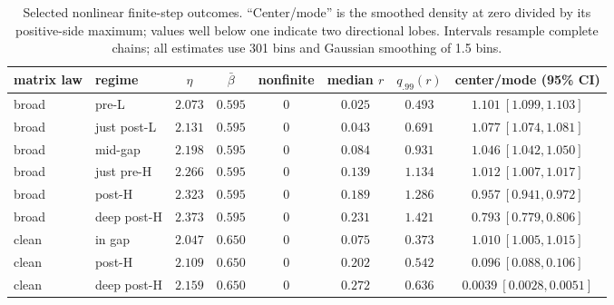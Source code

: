 \documentclass[11pt]{article}
\theoremstyle{definition}
\begin{document}
\begin{table}[ht]
\centering
\scriptsize
\begin{tabular}{@{}llcccccc@{}}
\toprule
matrix law & regime & $\eta$ & $\bar\beta$
& nonfinite & median $r$ & $q_{.99}(r)$ & center/mode (95\% CI) \\
\midrule
broad & pre-L & $2.073$ & $0.595$ & $0$ & $0.025$ & $0.493$ & $1.101\ [1.099,1.103]$ \\
broad & just post-L & $2.131$ & $0.595$ & $0$ & $0.043$ & $0.691$ & $1.077\ [1.074,1.081]$ \\
broad & mid-gap & $2.198$ & $0.595$ & $0$ & $0.084$ & $0.931$ & $1.046\ [1.042,1.050]$ \\
broad & just pre-H & $2.266$ & $0.595$ & $0$ & $0.139$ & $1.134$ & $1.012\ [1.007,1.017]$ \\
broad & post-H & $2.323$ & $0.595$ & $0$ & $0.189$ & $1.286$ & $0.957\ [0.941,0.972]$ \\
broad & deep post-H & $2.373$ & $0.595$ & $0$ & $0.231$ & $1.421$ & $0.793\ [0.779,0.806]$ \\
clean & in gap & $2.047$ & $0.650$ & $0$ & $0.075$ & $0.373$ & $1.010\ [1.005,1.015]$ \\
clean & post-H & $2.109$ & $0.650$ & $0$ & $0.202$ & $0.542$ & $0.096\ [0.088,0.106]$ \\
clean & deep post-H & $2.159$ & $0.650$ & $0$ & $0.272$ & $0.636$ & $0.0039\ [0.0028,0.0051]$ \\
\bottomrule
\end{tabular}
\caption{Selected nonlinear finite-step outcomes.  ``Center/mode'' is the
smoothed density at zero divided by its positive-side maximum; values well
below one indicate two directional lobes.  Intervals resample complete chains;
all estimates use 301 bins and Gaussian smoothing of 1.5 bins.}
\label{tab:nonlinear-results}
\end{table}
\end{document}
